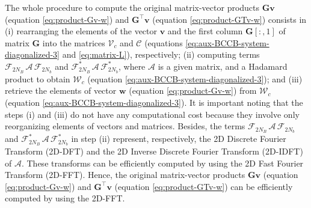 \documentclass[utf8]{FrontiersinHarvard} %
\begin{document}
	The whole procedure to compute the original matrix-vector products $\mathbf{G}\mathbf{v}$ (equation \ref{eq:product-Gv-w})
	and $\mathbf{G}^{\top}\mathbf{v}$ (equation \ref{eq:product-GTv-w}) consists in 
	(i) rearranging the elements of the vector $\mathbf{v}$ and the first column $\mathbf{G}[:,1]$ of matrix $\mathbf{G}$
	into the matrices $\boldsymbol{\mathcal{V}}_{c}$ and $\boldsymbol{\mathcal{C}}$ 
	(equations \ref{eq:aux-BCCB-system-diagonalized-3} and \ref{eq:matrix-L}), respectively;
	(ii) computing terms $\boldsymbol{\mathcal{F}}_{2N_{B}} \, \boldsymbol{\mathcal{A}} \, \boldsymbol{\mathcal{F}}_{2N_{b}}$
	and $\boldsymbol{\mathcal{F}}_{2N_{B}}^{\ast} \, \boldsymbol{\mathcal{A}} \, \boldsymbol{\mathcal{F}}_{2N_{b}}^{\ast}$,
	where $\boldsymbol{\mathcal{A}}$ is a given matrix, and a Hadamard product to obtain $\boldsymbol{\mathcal{W}}_{c}$ 
	(equation \ref{eq:aux-BCCB-system-diagonalized-3}); and
	(iii) retrieve the elements of vector $\mathbf{w}$ (equation \ref{eq:product-Gv-w}) from
	$\boldsymbol{\mathcal{W}}_{c}$ (equation \ref{eq:aux-BCCB-system-diagonalized-3}).
	It is important noting that the steps (i) and (iii) do not have any computational cost because they involve
	only reorganizing elements of vectors and matrices.
	Besides, the terms $\boldsymbol{\mathcal{F}}_{2N_{B}} \, \boldsymbol{\mathcal{A}} \, \boldsymbol{\mathcal{F}}_{2N_{b}}$
	and $\boldsymbol{\mathcal{F}}_{2N_{B}}^{\ast} \, \boldsymbol{\mathcal{A}} \, \boldsymbol{\mathcal{F}}_{2N_{b}}^{\ast}$
	in step (ii) represent, respectively, the 2D Discrete Fourier Transform (2D-DFT) and 
	the 2D Inverse Discrete Fourier Transform (2D-IDFT) of $\boldsymbol{\mathcal{A}}$.
	These transforms can be efficiently computed by using the 2D Fast Fourier Transform (2D-FFT).
	Hence, the original matrix-vector products $\mathbf{G}\mathbf{v}$ (equation \ref{eq:product-Gv-w})
	and $\mathbf{G}^{\top}\mathbf{v}$ (equation \ref{eq:product-GTv-w}) can be efficiently computed by using the 2D-FFT.
	
\end{document}
